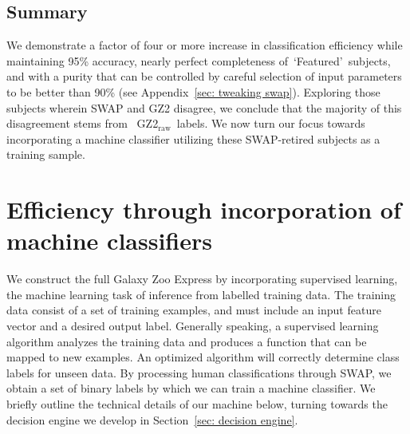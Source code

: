 \documentclass[twocolumn]{aastex6}%
\newcommand{\feat}{`Featured'}
\newcommand{\raw}{GZ2$_{\text{raw}}$}
\begin{document}
\subsection{Summary}



We demonstrate a factor of four or more increase in 
classification efficiency while maintaining 95\% accuracy, nearly perfect 
completeness of~\feat~subjects, and with a purity that can be controlled by careful 
selection of input parameters to be better than 90\% (see Appendix~\ref{sec: tweaking swap}).
Exploring those subjects wherein SWAP and GZ2 disagree, we conclude that 
the majority of this disagreement stems from ~\raw~labels.
We now turn our focus towards incorporating a machine
classifier utilizing these SWAP-retired subjects as a training sample. 


\section{Efficiency through incorporation of machine classifiers} \label{sec: machine}

We construct the full Galaxy Zoo Express by incorporating supervised 
learning, the machine learning task of inference from labelled training data. 
The training data consist of a set of training examples, and must include
an input feature vector and a desired output label.  Generally speaking,
a supervised learning algorithm analyzes the training data and produces a 
function that can be mapped to new examples. An optimized algorithm will 
correctly determine class labels for unseen data. By processing human classifications 
through SWAP, we obtain a set of binary labels by which we can train a machine 
classifier. We briefly outline the technical details of our machine below,  turning
towards the decision engine we develop in Section~\ref{sec: decision engine}. 
\end{document}
